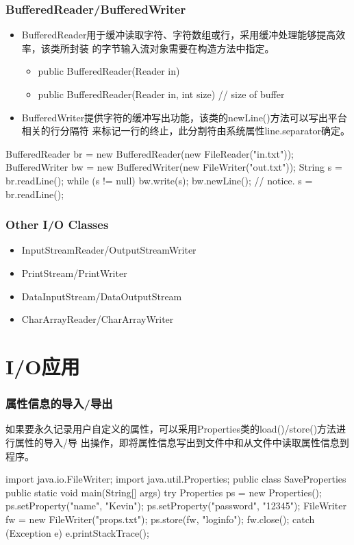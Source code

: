 \begin{frame}[fragile] %
\frametitle{BufferedReader/BufferedWriter}
\begin{itemize}
\item BufferedReader用于缓冲读取字符、字符数组或行，采用缓冲处理能够提高效率，该类所封装
  的字节输入流对象需要在构造方法中指定。
  
  \begin{itemize}
  \item public BufferedReader(Reader in)
  \item public BufferedReader(Reader in, int size) // size of buffer
  \end{itemize}
\item BufferedWriter提供字符的缓冲写出功能，该类的newLine()方法可以写出平台相关的行分隔符
  来标记一行的终止，此分割符由系统属性line.separator确定。
\end{itemize}
\begin{javaCode}
BufferedReader br = new BufferedReader(new FileReader("in.txt"));
BufferedWriter bw = new BufferedWriter(new FileWriter("out.txt"));
String s = br.readLine();
while (s != null) {
  bw.write(s);
  bw.newLine(); // notice.
  s = br.readLine();
}
\end{javaCode}
\end{frame}

\begin{frame}[fragile] %
\frametitle{Other I/O Classes}
\begin{itemize}
\item InputStreamReader/OutputStreamWriter
\item PrintStream/PrintWriter
\item DataInputStream/DataOutputStream
\item CharArrayReader/CharArrayWriter
\end{itemize}
\end{frame}

\section{I/O应用}



\begin{frame}[fragile] %
\frametitle{属性信息的导入/导出}

如果要永久记录用户自定义的属性，可以采用Properties类的load()/store()方法进行属性的导入/导
出操作，即将属性信息写出到文件中和从文件中读取属性信息到程序。
\begin{javaCode}
import java.io.FileWriter;
import java.util.Properties;
public class SaveProperties {
  public static void main(String[] args) {
    try {
      Properties ps = new Properties();
      ps.setProperty("name", "Kevin");
      ps.setProperty("password", "12345");
      FileWriter fw = new FileWriter("props.txt");
      ps.store(fw, "loginfo");
      fw.close();
    } catch (Exception e) {
      e.printStackTrace();
    }
  }
}
\end{javaCode}

\end{frame}

